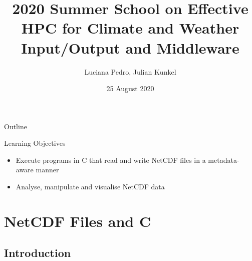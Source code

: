 \documentclass[compress,11pt,xcolor=svgnames,aspectratio=169]{beamer}
\title[Input/Output and Middleware -- Lab Session]{2020 Summer School on Effective HPC for Climate and Weather \\[0.5cm] Input/Output and Middleware}
\author[Pedro, Kunkel]{Luciana Pedro, Julian Kunkel
}
\institute[WP4 Team]{Department of Computer Science, University of Reading}
\date{25 August 2020}
\begin{document}
\begin{frame}[plain]
    \titlepage
\end{frame}

\begin{withoutheadline}
\begin{frame}{Outline}
    \begin{centering}
    \tableofcontents[hideallsubsections]
    \end{centering}

    \disclaimer
\end{frame}
\end{withoutheadline}


\begin{frame}[fragile]{Learning Objectives}

\begin{itemize}
\setlength\itemsep{1cm}
  \item Execute programs in C that read and write NetCDF files in a metadata-aware manner
  \item Analyse, manipulate and visualise NetCDF data
\end{itemize}

\end{frame}

\section{NetCDF Files and C}


\subsection{Introduction}
\end{document}
